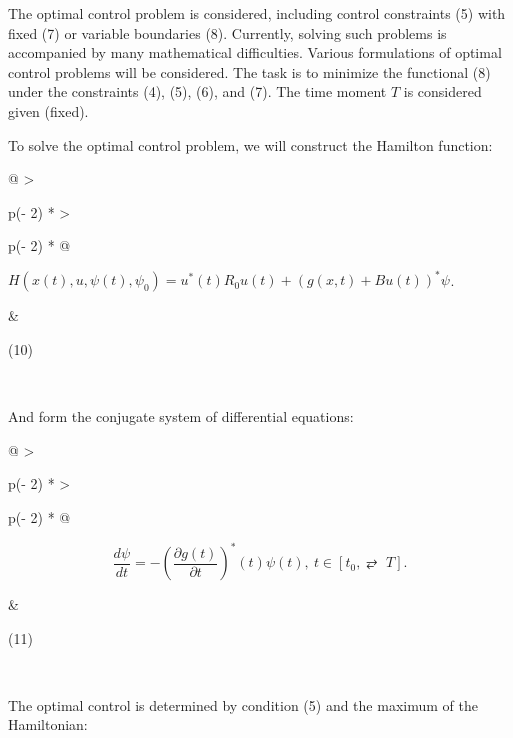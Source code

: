 The optimal control problem is considered, including control constraints
(5) with fixed (7) or variable boundaries (8). Currently, solving such
problems is accompanied by many mathematical difficulties. Various
formulations of optimal control problems will be considered. The task is
to minimize the functional (8) under the constraints (4), (5), (6), and
(7). The time moment \(T\) is considered given (fixed).

To solve the optimal control problem, we will construct the Hamilton
function:

\begin{longtable}[]{@{}
  >{\raggedright\arraybackslash}p{(\columnwidth - 2\tabcolsep) * }
  >{\raggedright\arraybackslash}p{(\columnwidth - 2\tabcolsep) * }@{}}
\toprule\noalign{}
\begin{minipage}[b]{\linewidth}\raggedright
\(H\left( x(t),u,\psi(t),\psi_{0} \right) = u^{*}(t)R_{0}u(t) + (g(x,t) + Bu(t))^{*}\psi_{}\).
\end{minipage} & \begin{minipage}[b]{\linewidth}\raggedright
(10)
\end{minipage} \\
\midrule\noalign{}
\endhead
\bottomrule\noalign{}
\endlastfoot
\end{longtable}

And form the conjugate system of differential equations:

\begin{longtable}[]{@{}
  >{\raggedright\arraybackslash}p{(\columnwidth - 2\tabcolsep) * }
  >{\raggedright\arraybackslash}p{(\columnwidth - 2\tabcolsep) * }@{}}
\toprule\noalign{}
\begin{minipage}[b]{\linewidth}\raggedright
\[\frac{d\psi}{dt} = - (\frac{\partial g(t)}{\partial t})^{*}(t)\psi(t),\ t \in \left\lbrack t_{0}, ⥂ \mspace{6mu} T \right\rbrack.\]
\end{minipage} & \begin{minipage}[b]{\linewidth}\raggedright
(11)
\end{minipage} \\
\midrule\noalign{}
\endhead
\bottomrule\noalign{}
\endlastfoot
\end{longtable}

The optimal control is determined by condition (5) and the maximum of
the Hamiltonian:

